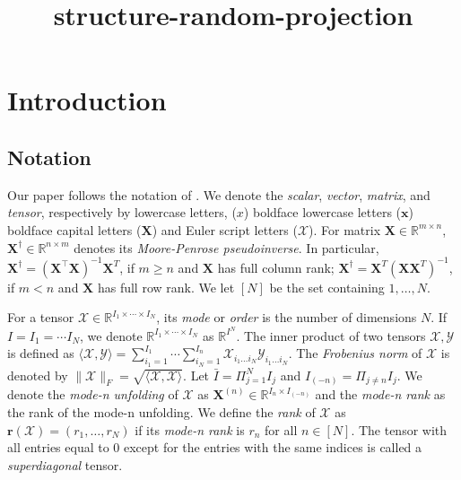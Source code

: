 \documentclass[letterpaper]{article}
\title{structure-random-projection}
\author{} %
\begin{document}
\maketitle




\section{Introduction}
\subsection{Notation}
Our paper follows the notation of \cite{kolda2009tensor}. We denote the \textit{scalar}, \textit{vector}, \textit{matrix}, and \textit{tensor}, respectively by lowercase letters, ($x$) boldface lowercase letters ($\mathbf{x}$)  boldface capital letters  ($\mathbf{X}$)  and Euler script letters ($\mathscr{X}$). For matrix $\mathbf{X} \in \mathbb{R}^{m \times n}$, $\mathbf{X}^\dag \in \mathbb{R}^{n \times m}$ denotes its \textit{Moore-Penrose pseudoinverse}. In particular, $\mathbf{X}^\dag = (\mathbf{X}^\top \mathbf{X})^{-1}\mathbf{X}^T$, if $m \geq n$ and $\mathbf{X}$ has full column rank; $\mathbf{X}^\dag = \mathbf{X}^T(\mathbf{XX}^T)^{-1}$, if $m < n$ and $\mathbf{X}$ has full row rank. We let $[N]$ be the set containing $1,\dots, N$.

For a tensor $\mathscr{X} \in \mathbb{R}^{I_1 \times \cdots \times I_N}$, its \textit{mode} or \textit{order} is the number of dimensions $N$. If $I = I_1 = \cdots I_N$, we denote $\mathbb{R}^{I_1 \times \cdots \times I_N}$ as $\mathbb{R}^{I^N}$. The inner product of two tensors $\mathscr{X}, \mathscr{Y}$ is defined as $\langle \mathscr{X}, \mathscr{Y}\rangle = \sum_{i_1=1}^{I_1}\cdots \sum_{i_N=1}^{I_n} \mathscr{X}_{i_1\dots i_N}\mathscr{Y}_{i_1\dots i_N}$. The \textit{Frobenius norm} of $\mathscr{X}$ is denoted by $\|\mathscr{X}\|_F = \sqrt{\langle \mathscr{X}, \mathscr{X}\rangle}$. Let $\bar{I} = \Pi_{j = 1}^N I_j $ and $I_{(-n)} = \Pi_{j \neq n} I_j $. We denote the \textit{mode-n unfolding} of $\mathscr{X}$ as $\mathbf{X}^{(n)} \in \mathbb{R}^{I_n \times I_{(-n)}}$ and the \textit{mode-n rank} as the rank of the mode-n unfolding. We define the \textit{rank} of  $\mathscr{X}$ as $\mathbf{r}(\mathscr{X}) = (r_1,\dots, r_N)$ if its \textit{mode-n rank} is $r_n$ for all $n\in [N]$. The tensor with all entries equal to 0 except for the entries with the same indices is called a \textit{superdiagonal} tensor.\par
\end{document}

